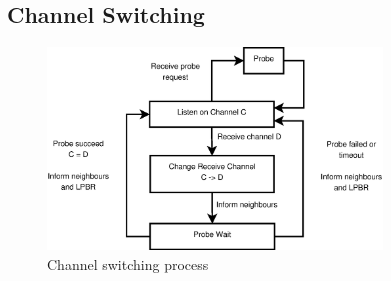 



\subsection{Channel Switching}



\begin{figure}
\centering
\includegraphics[width=3.5in]{Diagram1.eps}
\caption{Channel switching process}
\label{fig_sim}
\end{figure}

